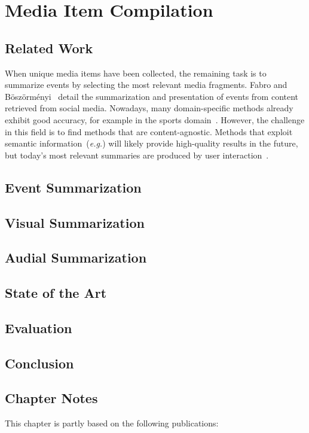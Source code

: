 

\chapter{Media Item Compilation}

\ifpdf
    \graphicspath{{8_media_item_compilation/figures/PNG/}{8_media_item_compilation/figures/PDF/}{8_media_item_compilation/figures/}}
\else
    \graphicspath{{8_media_item_compilation/figures/EPS/}{8_media_item_compilation/figures/}}
\fi


\section{Related Work}
\label{sec:related-work}

When unique media items have been collected, the remaining task is to summarize events by selecting the most relevant media fragments. Fabro and B\"osz\"orm\'enyi~\cite{Fabro:MMM12} detail the summarization and presentation of events from content retrieved from social media. Nowadays, many domain-specific methods already exhibit good accuracy, for example in the sports domain~\cite{Li1,Li2}. However, the challenge in this field is to find methods that are content-agnostic. Methods that exploit semantic information~(\emph{e.g.}\cite{Chen}) will likely provide high-quality results in the future, but today's most relevant summaries are produced by user interaction~\cite{Olsen}.


\section{Event Summarization}

\section{Visual Summarization}

\section{Audial Summarization}

\section{State of the Art}

\section{Evaluation}

\section{Conclusion}

\section*{Chapter Notes}
This chapter is partly based on the following publications:
